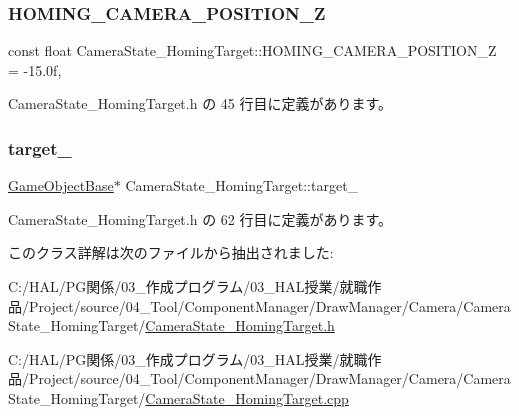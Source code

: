 \subsubsection{\texorpdfstring{H\+O\+M\+I\+N\+G\+\_\+\+C\+A\+M\+E\+R\+A\+\_\+\+P\+O\+S\+I\+T\+I\+O\+N\+\_\+Z}{HOMING\_CAMERA\_POSITION\_Z}}
{\footnotesize\ttfamily const float Camera\+State\+\_\+\+Homing\+Target\+::\+H\+O\+M\+I\+N\+G\+\_\+\+C\+A\+M\+E\+R\+A\+\_\+\+P\+O\+S\+I\+T\+I\+O\+N\+\_\+Z = -\/15.\+0f\hspace{0.3cm}{\ttfamily [static]}, {\ttfamily [private]}}



 Camera\+State\+\_\+\+Homing\+Target.\+h の 45 行目に定義があります。

\mbox{\label{class_camera_state___homing_target_a302d9fb35f1e46dab9a320287556c769}} 
\subsubsection{\texorpdfstring{target\+\_\+}{target\_}}
{\footnotesize\ttfamily \mbox{\hyperlink{class_game_object_base}{Game\+Object\+Base}}$\ast$ Camera\+State\+\_\+\+Homing\+Target\+::target\+\_\+\hspace{0.3cm}{\ttfamily [private]}}



 Camera\+State\+\_\+\+Homing\+Target.\+h の 62 行目に定義があります。



このクラス詳解は次のファイルから抽出されました\+:\begin{DoxyCompactItemize}
\item 
C\+:/\+H\+A\+L/\+P\+G関係/03\+\_\+作成プログラム/03\+\_\+\+H\+A\+L授業/就職作品/\+Project/source/04\+\_\+\+Tool/\+Component\+Manager/\+Draw\+Manager/\+Camera/\+Camera\+State\+\_\+\+Homing\+Target/\mbox{\hyperlink{_camera_state___homing_target_8h}{Camera\+State\+\_\+\+Homing\+Target.\+h}}\item 
C\+:/\+H\+A\+L/\+P\+G関係/03\+\_\+作成プログラム/03\+\_\+\+H\+A\+L授業/就職作品/\+Project/source/04\+\_\+\+Tool/\+Component\+Manager/\+Draw\+Manager/\+Camera/\+Camera\+State\+\_\+\+Homing\+Target/\mbox{\hyperlink{_camera_state___homing_target_8cpp}{Camera\+State\+\_\+\+Homing\+Target.\+cpp}}\end{DoxyCompactItemize}
